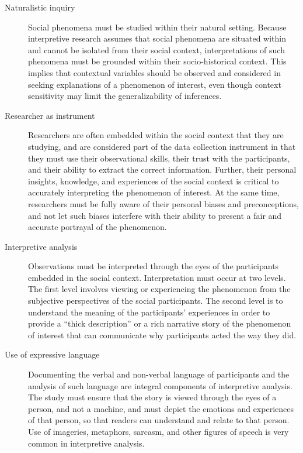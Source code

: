 \begin{description}
	\item[Naturalistic inquiry] Social phenomena must be studied within their natural setting. Because interpretive research assumes that social phenomena are situated within and cannot be isolated from their social context, interpretations of such phenomena must be grounded within their socio-historical context. This implies that contextual variables should be observed and considered in seeking explanations of a phenomenon of interest, even though context sensitivity may limit the generalizability of inferences.

	\item[Researcher as instrument] Researchers are often embedded within the social context that they are studying, and are considered part of the data collection instrument in that they must use their observational skills, their trust with the participants, and their ability to extract the correct information. Further, their personal insights, knowledge, and experiences of the social context is critical to accurately interpreting the phenomenon of interest. At the same time, researchers must be fully aware of their personal biases and preconceptions, and not let such biases interfere with their ability to present a fair and accurate portrayal of the phenomenon.

	\item[Interpretive analysis] Observations must be interpreted through the eyes of the participants embedded in the social context. Interpretation must occur at two levels. The first level involves viewing or experiencing the phenomenon from the subjective perspectives of the social participants. The second level is to understand the meaning of the participants' experiences in order to provide a ``thick description'' or a rich narrative story of the phenomenon of interest that can communicate why participants acted the way they did.

	\item[Use of expressive language] Documenting the verbal and non-verbal language of participants and the analysis of such language are integral components of interpretive analysis. The study must ensure that the story is viewed through the eyes of a person, and not a machine, and must depict the emotions and experiences of that person, so that readers can understand and relate to that person. Use of imageries, metaphors, sarcasm, and other figures of speech is very common in interpretive analysis.


\end{description}
